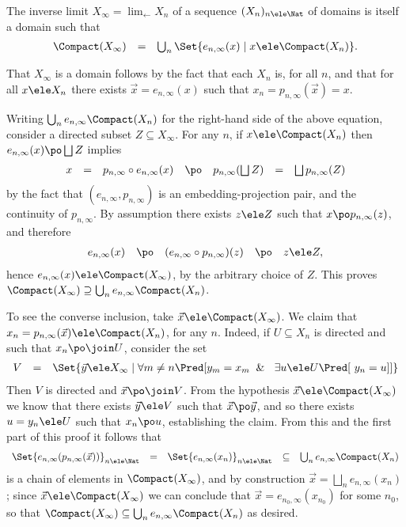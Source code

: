 \documentclass{CSML}
\newcommand{\vect}[1]{\vec{#1}}
\begin{document}
 \begin{prop} \label{prop:compactXinfty}
The inverse limit $X_\infty = \lim_\leftarrow X_n$ of a sequence $(X_n)_{n\ele \Nat}$ of domains is itself a domain such that
%
 \[ \begin{array}{rcl}
\Compact(X_\infty) 
	&=& 
\bigcup_n \Set{e_{n,\infty}(x) \mid x \ele \Compact(X_n)}.
 \end{array} \]
 \end{prop}

 \begin{Proof} That $X_\infty$ is a domain follows by the fact that each $X_n$ is, for all $n$, and that for all $x\ele X_n$ there exists $\vect{x} = e_{n,\infty}(x)$ such that $x_n = p_{n,\infty}(\vect{x}) = x$.

Writing $\bigcup_n e_{n,\infty} \Compact(X_n)$ for the right-hand side of the above equation, consider a directed subset $Z\subseteq X_\infty$.
For any $n$, if $x \ele \Compact(X_n)$ then $e_{n,\infty}(x) \po \bigsqcup Z$ implies
%
 \[ \begin{array}{rcl@{\quad}lccc}
x 
	&=& 
p_{n,\infty} \circ e_{n,\infty}(x) 
	&\po& 
p_{n,\infty}(\bigsqcup Z) 
	&=& 
\bigsqcup p_{n,\infty}(Z)
 \end{array} \]
by the fact that $(e_{n,\infty},p_{n,\infty})$ is an embedding-projection pair, and the continuity of $p_{n,\infty}$. By assumption there exists $z\ele Z$ such that $x \po p_{n,\infty}(z)$, and therefore 
%
 \[ \begin{array}{rcl@{\quad}lccc}
e_{n,\infty}(x) &\po& (e_{n,\infty}\circ p_{n,\infty})(z) &\po& z \ele Z ,
 \end{array} \] 
hence $e_{n,\infty}(x) \ele \Compact(X_\infty)$, by the arbitrary choice of $Z$. 
This proves $\Compact(X_\infty) \supseteq\bigcup_n e_{n,\infty} \Compact(X_n)$.

To see the converse inclusion, take $\vect{x} \ele \Compact(X_\infty)$. 
We claim that $x_n = p_{n,\infty}(\vect{x}) \ele \Compact(X_n)$, for any $n$. 
Indeed, if $U\subseteq X_n$ is directed and such that $x_n \po \join U$, consider the set 
%
 \[ \begin{array}{rcl}
V &=& \Set{ \vect{y} \ele X_\infty \mid \forall m\neq n \Pred[{ y_m = x_m \And\ \exists u \ele U \Pred[ \ y_n = u ] }] }
 \end{array} \]
Then $V$ is directed and $\vect{x} \po \join V$. 
From the hypothesis $\vect{x} \ele \Compact(X_\infty)$ we know that there exists $\vect{y} \ele V$ such that $\vect{x} \po\vect{y}$, and so there exists $u = y_n \ele U$ such that $x_n \po u$, establishing the claim. 
From this and the first part of this proof it follows that 
%
 \[ \begin{array}{rclcl}
\Set{e_{n,\infty}(p_{n,\infty}(\vect{x}))}_{n\ele \Nat} &=& \Set{e_{n,\infty}(x_n)}_{n\ele \Nat} &\subseteq& \bigcup_n e_{n,\infty} \Compact(X_n)
 \end{array} \] 
is a chain of elements in $\Compact(X_\infty)$, and by construction
$\vect{x} = \bigsqcup_n e_{n,\infty}(x_n)$; since $\vect{x} \ele \Compact(X_\infty)$ we can conclude that $\vect{x} = e_{n_0,\infty}(x_{n_0})$ for some $n_0$, so that $\Compact(X_\infty) \subseteq\bigcup_n e_{n,\infty} \Compact(X_n)$ as desired.
 \end{Proof}
\end{document}
